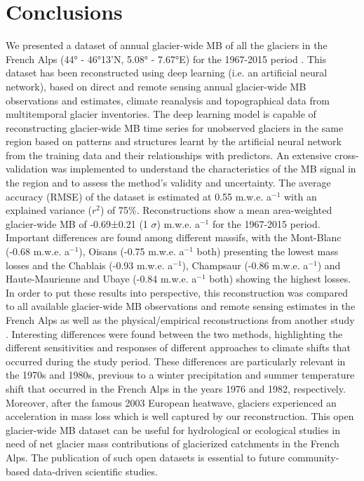 {\section{Conclusions} \label{past:conclusions}

We presented a dataset of annual glacier-wide MB of all the glaciers in the French Alps (44° - 46°13’N, 5.08° - 7.67°E) for the 1967-2015 period \citep{bolibar_deep_2020}. This dataset has been reconstructed using deep learning (i.e. an artificial neural network), based on direct and remote sensing annual glacier-wide MB observations and estimates, climate reanalysis and topographical data from multitemporal glacier inventories. The deep learning model is capable of reconstructing glacier-wide MB time series for unobserved glaciers in the same region based on patterns and structures learnt by the artificial neural network from the training data and their relationships with predictors. An extensive cross-validation was implemented to understand the characteristics of the MB signal in the region and to assess the method’s validity and uncertainty. The average accuracy (RMSE) of the dataset is estimated at 0.55 m.w.e. a$^{-1}$ with an explained variance ($r^{2}$) of 75\%. Reconstructions show a mean area-weighted glacier-wide MB of -0.69±0.21 (1 $\sigma$) m.w.e. a$^{-1}$ for the 1967-2015 period. Important differences are found among different massifs, with the Mont-Blanc (-0.68 m.w.e. a$^{-1}$), Oisans (-0.75 m.w.e. a$^{-1}$ both) presenting the lowest mass losses and the Chablais (-0.93 m.w.e. a$^{-1}$), Champsaur (-0.86 m.w.e. a$^{-1}$) and Haute-Maurienne and Ubaye (-0.84 m.w.e. a$^{-1}$ both) showing the highest losses. In order to put these results into perspective, this reconstruction was compared to all available glacier-wide MB observations and remote sensing estimates in the French Alps as well as the physical/empirical reconstructions from another study \citep[update from][]{marzeion_brief_2015}. Interesting differences were found between the two methods, highlighting the different sensitivities and responses of different approaches to climate shifts that occurred during the study period. These differences are particularly relevant in the 1970s and 1980s, previous to a winter precipitation and summer temperature shift that occurred in the French Alps in the years 1976 and 1982, respectively. Moreover, after the famous 2003 European heatwave, glaciers experienced an acceleration in mass loss which is well captured by our reconstruction. This open glacier-wide MB dataset can be useful for hydrological or ecological studies in need of net glacier mass contributions of glacierized catchments in the French Alps. The publication of such open datasets is essential to future community-based data-driven scientific studies.

}
